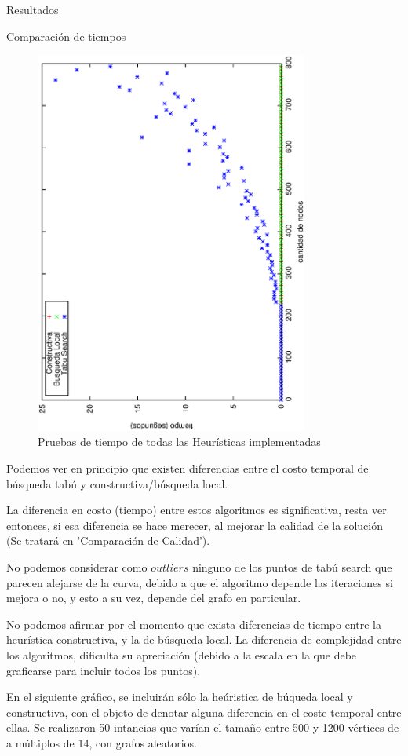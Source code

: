 \documentclass[12pt,titlepage]{article}
\newcommand{\VSP}{\vspace*{3em}}
\begin{document}
\begin{section}{Resultados}
\begin{subsection}{Comparación de tiempos}
		\begin{figure}[H]
			\centering
					\includegraphics[width=9cm,angle=-90]{conclusiones/heuris.eps}
			\caption{Pruebas de tiempo de todas las Heurísticas implementadas}
			\label{fig:Tiempo de Heuristicas}
		\end{figure}
		
		Podemos ver en principio que existen diferencias entre el costo temporal de búsqueda tabú y constructiva/búsqueda local.
		
		La diferencia en costo (tiempo) entre estos algoritmos es significativa, resta ver entonces, si esa diferencia se hace merecer, al mejorar la calidad de la solución (Se tratará en 'Comparación de Calidad').
		
		No podemos considerar como $outliers$ ninguno de los puntos de tabú search que parecen alejarse de la curva, debido a que el algoritmo depende las iteraciones si mejora o no, y esto a su vez, depende del grafo en particular.
		
		No podemos afirmar por el momento que exista diferencias de tiempo entre la heurística constructiva, y la de búsqueda local. La diferencia de complejidad entre los algoritmos, dificulta su apreciación (debido a la escala en la que debe graficarse para incluir todos los puntos).\VSP
		
		En el siguiente gráfico, se incluirán sólo la heúristica de búqueda local y constructiva, con el objeto de denotar alguna diferencia en el coste temporal entre ellas. Se realizaron 50 intancias que varían el tamaño entre 500 y 1200 vértices de a múltiplos de 14, con grafos aleatorios.


\end{subsection}
\end{section}
\end{document}
